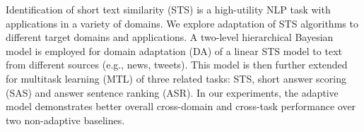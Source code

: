 Identification of short text similarity (STS) is a high-utility NLP task with applications in a variety of domains. We explore adaptation of STS algorithms to different target domains and applications. A two-level hierarchical Bayesian model is employed for domain adaptation (DA) of a linear STS model to text from different sources (e.g., news, tweets). This model is then further extended for multitask learning (MTL) of three related tasks: STS, short answer scoring (SAS) and answer sentence ranking (ASR). In our experiments, the adaptive model demonstrates better overall cross-domain and cross-task performance over two non-adaptive baselines.
